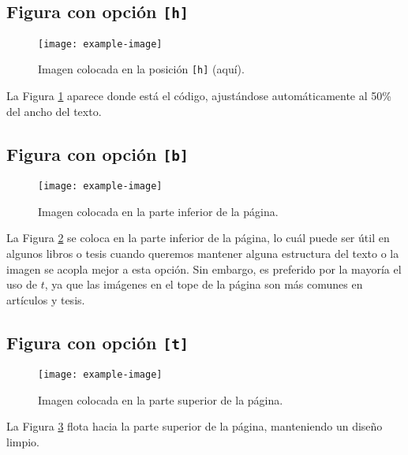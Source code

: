\documentclass[12pt]{article}
\begin{document}
\subsection{Figura con opción \texttt{[h]}}



\lipsum[4]

\begin{figure}[h] %
    \centering
    \texttt{[image: example-image]}
    \caption{Imagen colocada en la posición \texttt{[h]} (aquí).}
    \label{fig:h}
\end{figure}

La Figura \ref{fig:h} aparece donde está el código, ajustándose automáticamente al 50\% del ancho del texto.



\subsection{Figura con opción \texttt{[b]}}

\begin{figure}[b!] %
    \centering
    \texttt{[image: example-image]}
    \caption{Imagen colocada en la parte inferior de la página.}
    \label{fig:b}
\end{figure}

\lipsum[8]

La Figura \ref{fig:b} se coloca en la parte inferior de la página, lo cuál puede ser útil en algunos libros o tesis cuando queremos mantener alguna estructura del texto o la imagen se acopla mejor a esta opción. Sin embargo, es preferido por la mayoría el uso de $t$, ya que las imágenes en el tope de la página son más comunes en artículos y tesis. 


\subsection{Figura con opción \texttt{[t]}}

\lipsum[8]

\begin{figure}[t] %
    \centering
    \texttt{[image: example-image]}
    \caption{Imagen colocada en la parte superior de la página.}
    \label{fig:t}
\end{figure}



La Figura \ref{fig:t} flota hacia la parte superior de la página, manteniendo un diseño limpio.
\end{document}
